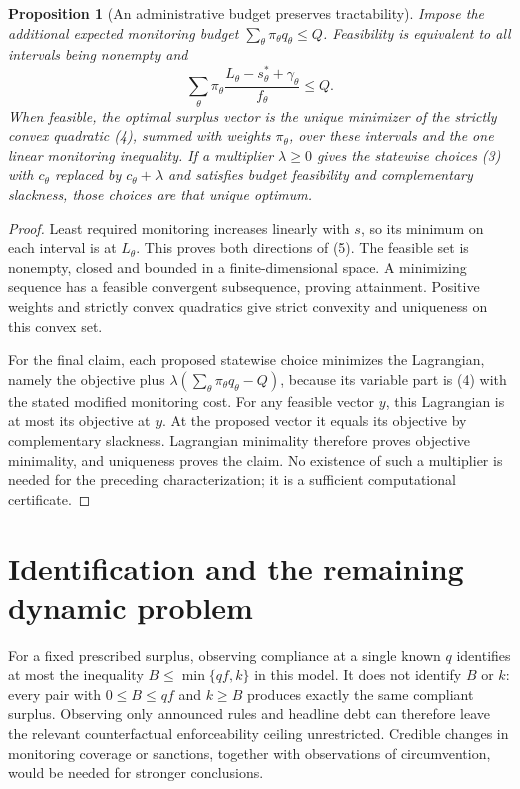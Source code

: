 \documentclass[11pt]{article}
\newtheorem{proposition}[theorem]{Proposition}
\theoremstyle{remark}
\begin{document}
\begin{proposition}[An administrative budget preserves tractability]
Impose the additional expected monitoring budget
$\sum_\theta\pi_\theta q_\theta\leq Q$.
Feasibility is equivalent to all intervals being nonempty and
\[
 \sum_\theta\pi_\theta
 \frac{L_\theta-s_\theta^*+\gamma_\theta}{f_\theta}\leq Q.
 \tag{5}
\]
When feasible, the optimal surplus vector is the unique minimizer of the
strictly convex quadratic (4), summed with weights $\pi_\theta$, over
these intervals and the one linear monitoring inequality.
If a multiplier $\lambda\geq0$ gives the statewise choices (3) with
$c_\theta$ replaced by $c_\theta+\lambda$ and satisfies budget feasibility
and complementary slackness, those choices are that unique optimum.
\end{proposition}
\begin{proof}
Least required monitoring increases linearly with $s$, so its minimum on
each interval is at $L_\theta$. This proves both directions of (5).
The feasible set is nonempty, closed and bounded in a finite-dimensional
space. A minimizing sequence has a feasible convergent subsequence,
proving attainment. Positive weights and strictly convex quadratics give
strict convexity and uniqueness on this convex set.

For the final claim, each proposed statewise choice minimizes the
Lagrangian, namely the objective plus
$\lambda(\sum_\theta\pi_\theta q_\theta-Q)$, because its variable part
is (4) with the stated modified monitoring cost. For any feasible vector
$y$, this Lagrangian is at most its objective at $y$. At the proposed
vector it equals its objective by complementary slackness. Lagrangian
minimality therefore proves objective minimality, and uniqueness proves
the claim. No existence of such a multiplier is needed for the preceding
characterization; it is a sufficient computational certificate.
\end{proof}

\section{Identification and the remaining dynamic problem}
For a fixed prescribed surplus, observing compliance at a single known
$q$ identifies at most the inequality $B\leq\min\{qf,k\}$ in this
model. It does not identify $B$ or $k$: every pair with
$0\leq B\leq qf$ and $k\geq B$ produces exactly the same compliant
surplus. Observing only announced rules and headline debt can therefore
leave the relevant counterfactual enforceability ceiling unrestricted.
Credible changes in monitoring coverage or sanctions, together with
observations of circumvention, would be needed for stronger conclusions.
\end{document}
